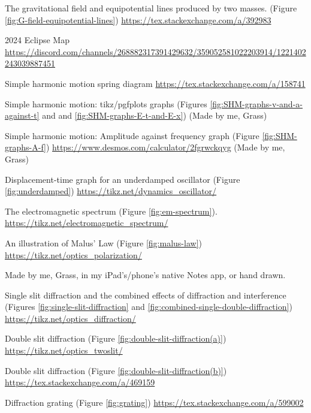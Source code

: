 \begin{enumerate}[label={[\arabic*]}]
    \item\label{source:G-field-equipotential-lines} The gravitational field and equipotential lines produced by two masses. (Figure \ref{fig:G-field-equipotential-lines}) \url{https://tex.stackexchange.com/a/392983}
    \item\label{2024 Eclipse Map} 2024 Eclipse Map \url{https://discord.com/channels/268882317391429632/359052581022203914/1221402243039887451}
    \item\label{Simple harmonic motion} Simple harmonic motion spring diagram \url{https://tex.stackexchange.com/a/158741}
    \item\label{Simple harmonic motion graphs} Simple harmonic motion: tikz/pgfplots graphs (Figures \ref{fig:SHM-graphs-v-and-a-against-t} and and \ref{fig:SHM-graphs-E-t-and-E-x}) (Made by me, Grass)
    \item\label{Simple harmonic motion amplitude-vs-frequency graph} Simple harmonic motion: Amplitude against frequency graph (Figure \ref{fig:SHM-graphs-A-f}) \url{https://www.desmos.com/calculator/2fgrwckqyg} (Made by me, Grass)
    \item\label{source:underdamped} Displacement-time graph for an underdamped oscillator (Figure \ref{fig:underdamped}) \url{https://tikz.net/dynamics_oscillator/}
    \item\label{source:em-spectrum} The electromagnetic spectrum (Figure \ref{fig:em-spectrum}). \url{https://tikz.net/electromagnetic_spectrum/}
    \item\label{source:malus-law} An illustration of Malus' Law (Figure \ref{fig:malus-law}) \url{https://tikz.net/optics_polarization/} 
    \item\label{Me} Made by me, Grass, in my iPad's/phone's native Notes app, or hand drawn.
    \item\label{source:single-slit-diffraction} Single slit diffraction and the combined effects of diffraction and interference (Figures \ref{fig:single-slit-diffraction} and \ref{fig:combined-single-double-diffraction}) \url{https://tikz.net/optics_diffraction/}
    \item\label{source:double-slit-diffraction(a)} Double slit diffraction (Figure \ref{fig:double-slit-diffraction(a)}) \url{https://tikz.net/optics_twoslit/}
    \item\label{source:double-slit-diffraction(b)} Double slit diffraction (Figure \ref{fig:double-slit-diffraction(b)}) \url{https://tex.stackexchange.com/a/469159}
    \item\label{source:grating} Diffraction grating (Figure \ref{fig:grating}) \url{https://tex.stackexchange.com/a/599002}

\end{enumerate}
